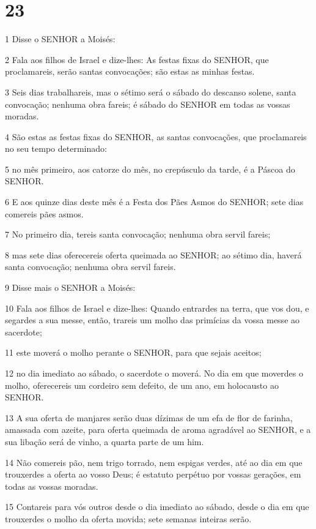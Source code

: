 \chapter{23}

\par 1 Disse o SENHOR a Moisés:
\par 2 Fala aos filhos de Israel e dize-lhes: As festas fixas do SENHOR, que proclamareis, serão santas convocações; são estas as minhas festas.
\par 3 Seis dias trabalhareis, mas o sétimo será o sábado do descanso solene, santa convocação; nenhuma obra fareis; é sábado do SENHOR em todas as vossas moradas.
\par 4 São estas as festas fixas do SENHOR, as santas convocações, que proclamareis no seu tempo determinado:
\par 5 no mês primeiro, aos catorze do mês, no crepúsculo da tarde, é a Páscoa do SENHOR.
\par 6 E aos quinze dias deste mês é a Festa dos Pães Asmos do SENHOR; sete dias comereis pães asmos.
\par 7 No primeiro dia, tereis santa convocação; nenhuma obra servil fareis;
\par 8 mas sete dias oferecereis oferta queimada ao SENHOR; ao sétimo dia, haverá santa convocação; nenhuma obra servil fareis.
\par 9 Disse mais o SENHOR a Moisés:
\par 10 Fala aos filhos de Israel e dize-lhes: Quando entrardes na terra, que vos dou, e segardes a sua messe, então, trareis um molho das primícias da vossa messe ao sacerdote;
\par 11 este moverá o molho perante o SENHOR, para que sejais aceitos;
\par 12 no dia imediato ao sábado, o sacerdote o moverá. No dia em que moverdes o molho, oferecereis um cordeiro sem defeito, de um ano, em holocausto ao SENHOR.
\par 13 A sua oferta de manjares serão duas dízimas de um efa de flor de farinha, amassada com azeite, para oferta queimada de aroma agradável ao SENHOR, e a sua libação será de vinho, a quarta parte de um him.
\par 14 Não comereis pão, nem trigo torrado, nem espigas verdes, até ao dia em que trouxerdes a oferta ao vosso Deus; é estatuto perpétuo por vossas gerações, em todas as vossas moradas.
\par 15 Contareis para vós outros desde o dia imediato ao sábado, desde o dia em que trouxerdes o molho da oferta movida; sete semanas inteiras serão.
